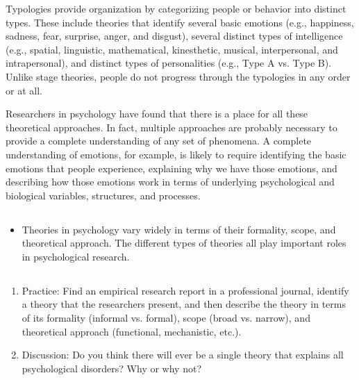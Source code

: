 Typologies provide organization by categorizing people or behavior into distinct types. These include theories that identify several basic emotions (e.g., happiness, sadness, fear, surprise, anger, and disgust), several distinct types of intelligence (e.g., spatial, linguistic, mathematical, kinesthetic, musical, interpersonal, and intrapersonal), and distinct types of personalities (e.g., Type A vs. Type B). Unlike stage theories, people do not progress through the typologies in any order or at all.

Researchers in psychology have found that there is a place for all these theoretical approaches. In fact, multiple approaches are probably necessary to provide a complete understanding of any set of phenomena. A complete understanding of emotions, for example, is likely to require identifying the basic emotions that people experience, explaining why we have those emotions, and describing how those emotions work in terms of underlying psychological and biological variables, structures, and processes.


\subsection{}

\begin{fullwidth}
\begin{itemize}
\item  Theories in psychology vary widely in terms of their formality, scope, and theoretical approach. The different types of theories all play important roles in psychological research.
\end{itemize}
\end{fullwidth}


\subsection{}
\begin{fullwidth}
\begin{enumerate}
\item Practice: Find an empirical research report in a professional journal, identify a theory that the researchers present, and then describe the theory in terms of its formality (informal vs. formal), scope (broad vs. narrow), and theoretical approach (functional, mechanistic, etc.).
\item Discussion: Do you think there will ever be a single theory that explains all psychological disorders? Why or why not?
\end{enumerate}
\end{fullwidth}

